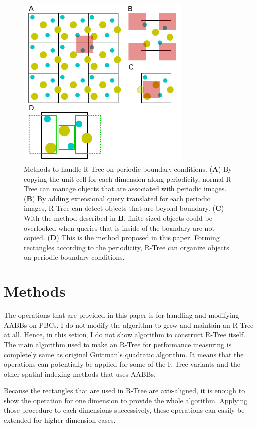\documentclass[10pt,letterpaper,twocolumn]{article}
\begin{document}
\begin{figure}[hbt]
    \includegraphics[width=8.4cm, bb=6 3 220 224]{fig1.eps}
    \caption{Methods to handle R-Tree on periodic boundary conditions.
    (\textbf{A})
    By copying the unit cell for each dimension along periodicity, normal R-Tree
    can manage objects that are associated with periodic images.
    (\textbf{B})
    By adding extensional query translated for each periodic images, R-Tree can
    detect objects that are beyond boundary.
    (\textbf{C})
    With the method described in \textbf{B}, finite sized objects could be
    overlooked when queries that is inside of the boundary are not copied.
    (\textbf{D})
    This is the method proposed in this paper. Forming rectangles according to
    the periodicity, R-Tree can organize objects on periodic boundary
    conditions.}
    \label{fig1}
\end{figure}

\section*{Methods}

The operations that are provided in this paper is for handling and modifying
AABBs on PBCs.
I do not modify the algorithm to grow and maintain an R-Tree at all.
Hence, in this setion, I do not show algorithm to construct R-Tree itself.
The main algorithm used to make an R-Tree for performance measuring is
completely same as original Guttman's quadratic algorithm.
It means that the operations can potentially be applied for some of the R-Tree
variants and the other spatial indexing methods that uses AABBs.

Because the rectangles that are used in R-Tree are axis-aligned, it is
enough to show the operation for one dimension to provide the whole algorithm.
Applying those procedure to each dimensions successively, these operations can
easily be extended for higher dimension cases.
\end{document}
